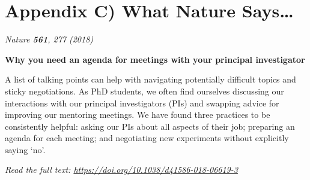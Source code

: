 \documentclass[
  english,
]{article}
\begin{document}
\hypertarget{appendix-c-what-nature-says}{%
\section{Appendix C) What Nature
Says\ldots{}}\label{appendix-c-what-nature-says}}

\emph{Nature \textbf{561}, 277 (2018)}

\textbf{Why you need an agenda for meetings with your principal
investigator}

A list of talking points can help with navigating potentially difficult
topics and sticky negotiations. As PhD students, we often find ourselves
discussing our interactions with our principal investigators (PIs) and
swapping advice for improving our mentoring meetings. We have found
three practices to be consistently helpful: asking our PIs about all
aspects of their job; preparing an agenda for each meeting; and
negotiating new experiments without explicitly saying `no'.

\emph{Read the full text:
\url{https://doi.org/10.1038/d41586-018-06619-3}}
\end{document}
